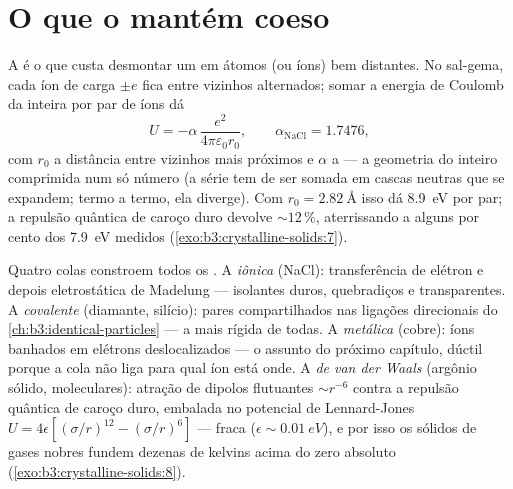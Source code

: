 \section{O que o mantém coeso}

\begin{proposition}\label{prop:b3:crystalline-solids:madelung}
A \emph{} é o que custa desmontar um 
em átomos (ou íons) bem distantes. No sal-gema, cada íon de carga
$\pm e$ fica entre vizinhos alternados; somar a energia de Coulomb da
 inteira por par de íons dá
\[
U = -\alpha\,\frac{e^2}{4\pi\varepsilon_0 r_0} ,
\qquad \alpha_{\text{NaCl}} = 1.7476 ,
\]
com $r_0$ a distância entre vizinhos mais próximos e $\alpha$ a
\emph{} --- a geometria do  inteiro
comprimida num só número (a série tem de ser somada em cascas
neutras que se expandem; termo a termo, ela diverge). Com $r_0 =
\qty{2.82}{\angstrom}$ isso dá \qty{8.9}{eV} por par;
a repulsão quântica de caroço duro devolve $\sim12\,\%$, aterrissando a
alguns por cento dos \qty{7.9}{eV} medidos
(\cref{exo:b3:crystalline-solids:7}).
\end{proposition}
\admitted

\begin{remark}\label{rem:b3:crystalline-solids:bonds}
Quatro colas constroem todos os . A \emph{iônica} (NaCl):
transferência de elétron e depois eletrostática de Madelung --- isolantes
duros, quebradiços e transparentes. A \emph{covalente} (diamante,
silício): pares compartilhados nas ligações direcionais do
\cref{ch:b3:identical-particles} --- a mais rígida de todas.
A \emph{metálica} (cobre): íons banhados em elétrons deslocalizados ---
o assunto do próximo capítulo, dúctil porque a cola não liga
para qual íon está onde. A \emph{de van der Waals} (argônio sólido,
 moleculares): atração de dipolos flutuantes $\sim r^{-6}$ contra
a repulsão quântica de caroço duro, embalada no potencial de
Lennard-Jones $U = 4\epsilon[(\sigma/r)^{12} - (\sigma/r)^6]$ --- fraca
($\epsilon \sim \qty{0.01}{eV}$), e por isso os sólidos de gases nobres
fundem dezenas de kelvins acima do zero absoluto
(\cref{exo:b3:crystalline-solids:8}).
\end{remark}

